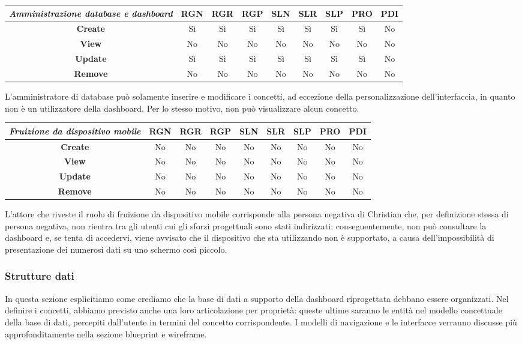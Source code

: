 {
\renewcommand{\arraystretch}{2}
\begin{longtable}[h]{| c | c | c | c | c | c | c | c | c |}
    \hline
    \textit{Amministrazione database e dashboard} & \textbf{RGN} & \textbf{RGR} & \textbf{RGP} & \textbf{SLN} & \textbf{SLR} & \textbf{SLP} & \textbf{PRO} & \textbf{PDI} \\
    \hline
    \endhead
    \textbf{Create} & Sì & Sì & Sì & Sì & Sì & Sì & Sì & No \\
    \hline
    \textbf{View}   & No & No & No & No & No & No & No & No \\
    \hline
    \textbf{Update} & Sì & Sì & Sì & Sì & Sì & Sì & Sì & No \\
    \hline
    \textbf{Remove} & No & No & No & No & No & No & No & No \\
    \hline
\end{longtable}
}
\noindent
L'amministratore di database può solamente inserire e modificare i concetti, ad eccezione della personalizzazione dell'interfaccia, in quanto non è un utilizzatore della dashboard.
Per lo stesso motivo, non può visualizzare alcun concetto.

{
\renewcommand{\arraystretch}{2}
\begin{longtable}[h]{| c | c | c | c | c | c | c | c | c |}
    \hline
    \textit{Fruizione da dispositivo mobile} & \textbf{RGN} & \textbf{RGR} & \textbf{RGP} & \textbf{SLN} & \textbf{SLR} & \textbf{SLP} & \textbf{PRO} & \textbf{PDI} \\
    \hline
    \endhead
    \textbf{Create} & No & No & No & No & No & No & No & No \\
    \hline
    \textbf{View}   & No & No & No & No & No & No & No & No \\
    \hline
    \textbf{Update} & No & No & No & No & No & No & No & No \\
    \hline
    \textbf{Remove} & No & No & No & No & No & No & No & No \\
    \hline
\end{longtable}
}
\noindent
L'attore che riveste il ruolo di fruizione da dispositivo mobile corrisponde alla persona negativa di Christian che, per definizione stessa di persona negativa, non rientra tra gli utenti cui gli sforzi progettuali sono stati indirizzati: conseguentemente, non può consultare la dashboard e, se tenta di accedervi, viene avvisato che il dispositivo che sta utilizzando non è supportato, a causa dell'impossibilità di presentazione dei numerosi dati su uno schermo così piccolo.

\subsubsection{Strutture dati}
\label{sss:strutture-dati}
In questa sezione esplicitiamo come crediamo che la base di dati a supporto della dashboard riprogettata debbano essere organizzati. Nel definire i concetti, abbiamo previsto anche una loro articolazione per proprietà: queste ultime saranno le entità nel modello concettuale della base di dati, percepiti dall'utente in termini del concetto corrispondente.
I modelli di navigazione e le interfacce verranno discusse più approfonditamente nella sezione blueprint e wireframe.